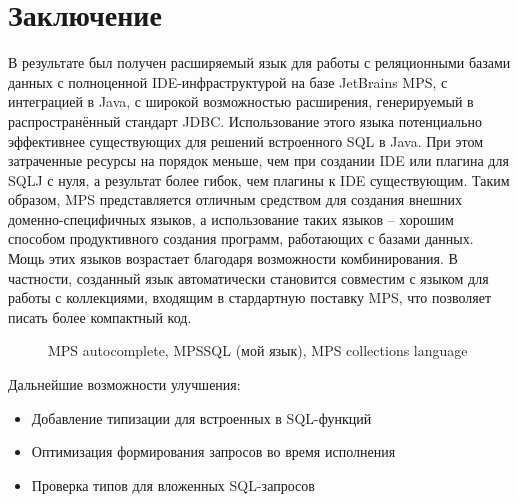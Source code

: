 \documentclass[12pt]{article}
\begin{document}
\section{Заключение}
В результате был получен расширяемый язык для работы с реляционными базами данных с полноценной IDE-инфраструктурой на базе JetBrains MPS, с интеграцией в Java, с широкой возможностью расширения, генерируемый в распространённый стандарт JDBC. Использование этого языка потенциально эффективнее существующих для решений встроенного SQL в Java. При этом затраченные ресурсы на порядок меньше, чем при создании IDE или плагина для SQLJ с нуля, а результат более гибок, чем плагины к IDE существующим. Таким образом, MPS представляется отличным средством для создания внешних доменно-специфичных языков, а использование таких языков -- хорошим способом продуктивного создания программ, работающих с базами данных. Мощь этих языков возрастает благодаря возможности комбинирования. В частности, созданный язык автоматически становится совместим с языком для работы с коллекциями, входящим в стардартную поставку MPS, что позволяет писать более компактный код.
\begin{figure}[h]
\caption{MPS autocomplete, MPSSQL (мой язык), MPS collections language}
\end{figure}

Дальнейшие возможности улучшения:
\begin{itemize}
\item Добавление типизации для встроенных в SQL-функций
\item Оптимизация формирования запросов во время исполнения
\item Проверка типов для вложенных SQL-запросов
\end{itemize}
\end{document}
